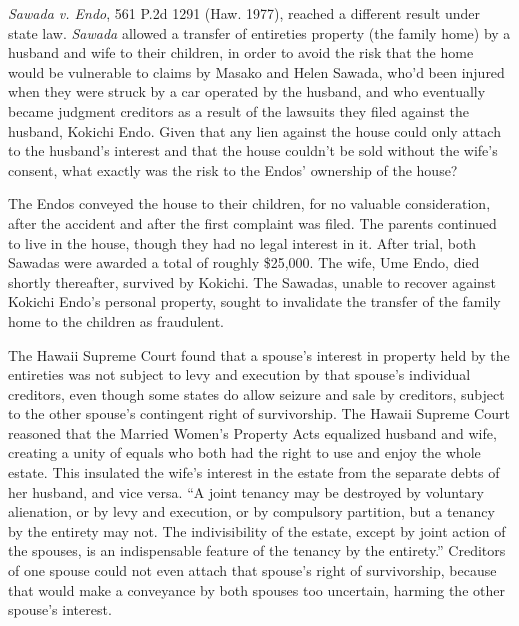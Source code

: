 
\item \textit{Sawada v. Endo}, 561 P.2d 1291 (Haw. 1977), reached a different
result under state law. \textit{Sawada} allowed a transfer of entireties
property (the family home) by a husband and wife to their children, in order to
avoid the risk that the home would be vulnerable to claims by Masako and Helen
Sawada, who'd been injured when they were struck by a car operated by the
husband, and who eventually became judgment creditors as a result of the
lawsuits they filed against the husband, Kokichi Endo. Given that any lien
against the house could only attach to the husband's interest and that the
house couldn't be sold without the wife's consent, what exactly was the risk to
the Endos' ownership of the house?


The Endos conveyed the house to their children, for no valuable consideration,
after the accident and after the first complaint was filed. The parents
continued to live in the house, though they had no legal interest in it. After
trial, both Sawadas were awarded a total of roughly \$25,000. The wife, Ume
Endo, died shortly thereafter, survived by Kokichi. The Sawadas, unable to
recover against Kokichi Endo's personal property, sought to invalidate the
transfer of the family home to the children as fraudulent.



The Hawaii Supreme Court found that a spouse's interest in property held by the
entireties was not subject to levy and execution by that spouse's individual
creditors, even though some states do allow seizure and sale by creditors,
subject to the other spouse's contingent right of survivorship. The Hawaii
Supreme Court reasoned that the Married Women's Property Acts equalized husband
and wife, creating a unity of equals who both had the right to use and enjoy
the whole estate. This insulated the wife's interest in the estate from the
separate debts of her husband, and vice versa. ``A joint tenancy may be
destroyed by voluntary alienation, or by levy and execution, or by compulsory
partition, but a tenancy by the entirety may not. The indivisibility of the
estate, except by joint action of the spouses, is an indispensable feature of
the tenancy by the entirety.'' Creditors of one spouse could not even attach
that spouse's right of survivorship, because that would make a conveyance by
both spouses too uncertain, harming the other spouse's interest.



